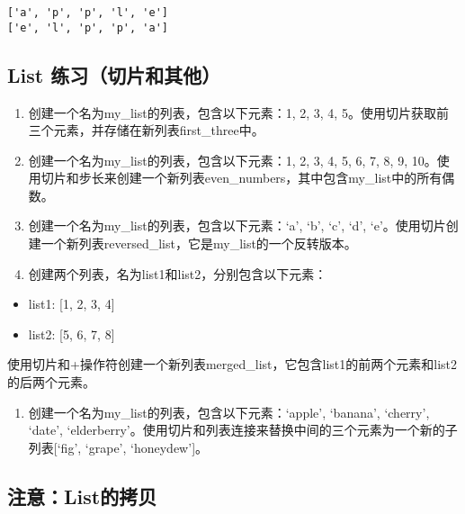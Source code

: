 \documentclass[
  letterpaper,
  DIV=11,
  numbers=noendperiod]{scrreprt}
\providecommand{\tightlist}{%
  \setlength{\itemsep}{0pt}\setlength{\parskip}{0pt}}\usepackage{longtable,booktabs,array}
\begin{document}
\begin{verbatim}
['a', 'p', 'p', 'l', 'e']
['e', 'l', 'p', 'p', 'a']
\end{verbatim}

\hypertarget{list-ux7ec3ux4e60ux5207ux7247ux548cux5176ux4ed6}{%
\subsection{List
练习（切片和其他）}\label{list-ux7ec3ux4e60ux5207ux7247ux548cux5176ux4ed6}}

\begin{enumerate}
\def\labelenumi{\arabic{enumi}.}
\item
  创建一个名为my\_list的列表，包含以下元素：1, 2, 3, 4,
  5。使用切片获取前三个元素，并存储在新列表first\_three中。
\item
  创建一个名为my\_list的列表，包含以下元素：1, 2, 3, 4, 5, 6, 7, 8, 9,
  10。使用切片和步长来创建一个新列表even\_numbers，其中包含my\_list中的所有偶数。
\item
  创建一个名为my\_list的列表，包含以下元素：`a', `b', `c', `d',
  `e'。使用切片创建一个新列表reversed\_list，它是my\_list的一个反转版本。
\item
  创建两个列表，名为list1和list2，分别包含以下元素：
\end{enumerate}

\begin{itemize}
\tightlist
\item
  list1: {[}1, 2, 3, 4{]}
\item
  list2: {[}5, 6, 7, 8{]}
\end{itemize}

使用切片和+操作符创建一个新列表merged\_list，它包含list1的前两个元素和list2的后两个元素。

\begin{enumerate}
\def\labelenumi{\arabic{enumi}.}
\setcounter{enumi}{4}
\tightlist
\item
  创建一个名为my\_list的列表，包含以下元素：`apple', `banana', `cherry',
  `date',
  `elderberry'。使用切片和列表连接来替换中间的三个元素为一个新的子列表{[}`fig',
  `grape', `honeydew'{]}。
\end{enumerate}

\hypertarget{ux6ce8ux610flistux7684ux62f7ux8d1d}{%
\subsection{注意：List的拷贝}\label{ux6ce8ux610flistux7684ux62f7ux8d1d}}
\end{document}
